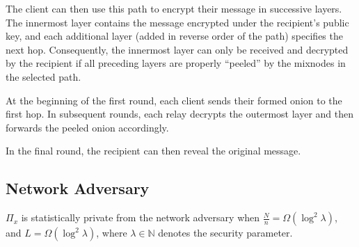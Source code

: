 The client can then use this path to encrypt their message in successive layers. The innermost layer contains the message encrypted under the recipient’s public key, and each additional layer (added in reverse order of the path) specifies the next hop. Consequently, the innermost layer can only be received and decrypted by the recipient if all preceding layers are properly ``peeled'' by the mixnodes in the selected path.

At the beginning of the first round, each client sends their formed onion to the first hop. In subsequent rounds, each relay decrypts the outermost layer and then forwards the peeled onion accordingly.

In the final round, the recipient can then reveal the original message.


\subsection{Network Adversary}
\begin{theorem} \label{clm:network}
    $\Pi_x$ is statistically private from the network adversary when $\frac{N}{n} = \Omega(\log^2 \lambda)$, and $L = \Omega(\log^2 \lambda)$, where $\lambda \in \mathbb{N}$ denotes the security parameter.\\
\end{theorem}
